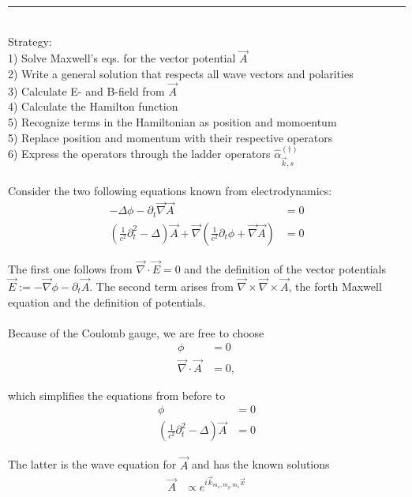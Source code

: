 \documentclass{article}
\newcommand{\lr}[1]{\left(#1\right)}
\begin{document}
{\color{violet}
\hrule
	\\
	Strategy:\\
	1) Solve Maxwell's eqs. for the vector potential $\vec{A}$\\
	2) Write a general solution that respects all wave vectors and polarities\\
	3) Calculate E- and B-field from $\vec{A}$\\
	4) Calculate the Hamilton function\\
	5) Recognize terms in the Hamiltonian as position and momoentum\\
	5) Replace position and momentum with their respective operators\\
	6) Express the operators through the ladder operators $\hat{\alpha}_{\vec{k},s}^{(\dagger)}$\\
	\\
	Consider the two following equations known from electrodynamics:
		\begin{align*}
			-\Delta \phi - \partial_t\vec{\nabla}\vec{A} &= 0 \\
			\lr{ \frac{1}{c^2} \partial_t^2 - \Delta } \vec{A} + \vec{\nabla} \lr{ \frac{1}{c^2}\partial_t \phi + \vec{\nabla}\vec{A} } &= 0
		\end{align*}
	
	The first one follows from $\vec{\nabla}\cdot\vec{E}=0$ and the definition of the vector potentials $\vec{E} := -\vec{\nabla}\phi - \partial_t\vec{A}$. The second term arises from $\vec{\nabla}\times\vec{\nabla}\times\vec{A}$, the forth Maxwell equation and the definition of potentials.\\
	\\
	Because of the Coulomb gauge, we are free to choose
		\begin{align*}
			\phi &= 0 \\
			\vec{\nabla} \cdot \vec{A} &= 0,
		\end{align*}
	
	which simplifies the equations from before to
		\begin{align*}
			\phi &= 0 \\
			\lr{ \frac{1}{c^2} \partial_t^2 - \Delta } \vec{A} &= 0
		\end{align*}

	The latter is the wave equation for $\vec{A}$ and has the known solutions
		\begin{align*}
			\vec{A} &\propto e^{i\vec{k}_{m_x,m_y,m_z}\vec{x}}
		\end{align*}

}
\end{document}
